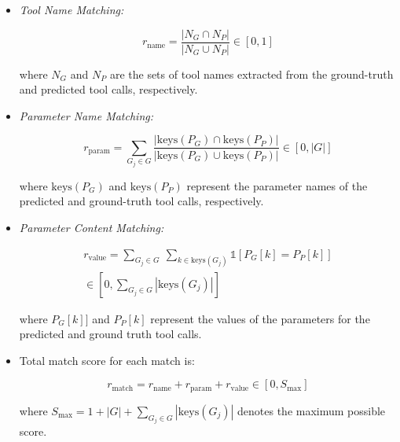 \begin{itemize}[topsep=2pt, leftmargin=10pt, itemsep=0pt]
\item \textit{Tool Name Matching:}
\begin{small}
\begin{equation*}
r_{\text{name}} = \frac{|N_G \cap N_P|}{|N_G \cup N_P|} \in [0, 1]
\end{equation*}
\end{small}
where \( N_G \) and \( N_P \) are the sets of tool names extracted from the ground-truth and predicted tool calls, respectively. 

\item \textit{Parameter Name Matching:}
\begin{small}
\begin{equation*}
r_{\text{param}} = \sum_{G_j \in G} \frac{|\text{keys}(P_G) \cap \text{keys}(P_P)|}{|\text{keys}(P_G) \cup \text{keys}(P_P)|} \in [0, |G|]
\end{equation*}
\end{small}
where \( \text{keys}(P_G) \) and \( \text{keys}(P_P) \) represent the parameter names of the predicted and ground-truth tool calls, respectively.

\item \textit{Parameter Content Matching:}
\begin{small}
\begin{equation*}
\begin{split}
r_{\text{value}} = \sum_{G_j \in G} \ \sum_{k \in \text{keys}(G_j)} \mathds{1}[P_G[k] = P_P[k]] \\
\in [0, \sum_{G_j \in G} |\text{keys}(G_j)|]
\end{split}
\end{equation*}
\end{small}
where \( P_G[k]] \) and \( P_P[k] \) represent the values of the parameters for the predicted and ground truth tool calls.

\item Total match score for each match is:
\begin{small}
\begin{equation*}
r_{\text{match}} = r_{\text{name}} + r_{\text{param}} + r_{\text{value}} \in [0, S_{\max}]
\end{equation*}
\end{small}
where \( S_{\max} = 1 + |G| + \sum_{G_j \in G} |\text{keys}(G_j)|\) denotes the maximum possible score.
\end{itemize}

